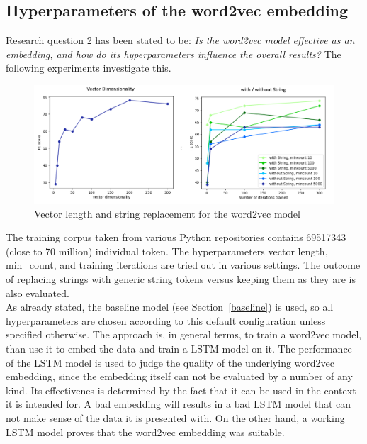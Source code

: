 \documentclass[
a4paper,
pagesize,
pdftex,
12pt,
twoside, %
BCOR=5mm, %
ngerman,
fleqn,
final,
]{scrartcl}
\begin{document}
	\subsection{Hyperparameters of the word2vec embedding}
	
	Research question 2 has been stated to be: \textit{Is the word2vec model effective as an embedding, and how do its hyperparameters influence the overall results?} The following experiments investigate this. 
	
	\begin{figure}[h]
		\centering
		\includegraphics[width=1\textwidth]{img/word2vecHyper2}
		\caption{Vector length and string replacement for the word2vec model}
		\label{fig:w2vhyper2}
	\end{figure}
	
	The training corpus taken from various Python repositories contains 69517343 (close to 70 million) individual token. The hyperparameters vector length, min\_count, and training iterations are tried out in various settings. The outcome of replacing strings with generic string tokens versus keeping them as they are is also evaluated.\\
	As already stated, the baseline model (see Section~\ref{baseline}) is used, so all hyperparameters are chosen according to this default configuration unless specified otherwise. The approach is, in general terms, to train a word2vec model, than use it to embed the data and train a LSTM model on it. The performance of the LSTM model is used to judge the quality of the underlying word2vec embedding, since the embedding itself can not be evaluated by a number of any kind. Its effectivenes is determined by the fact that it can be used in the context it is intended for. A bad embedding will results in a bad LSTM model that can not make sense of the data it is presented with. On the other hand, a working LSTM model proves that the word2vec embedding was suitable.
	
\end{document}
